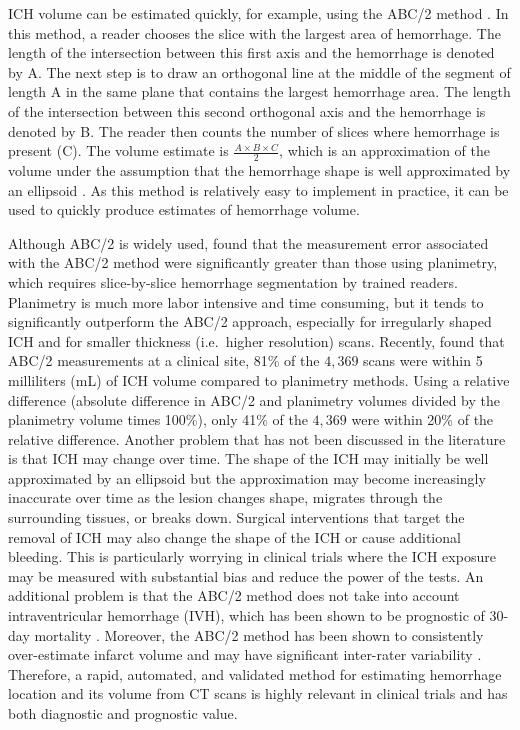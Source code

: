 \documentclass{elsarticle_nonatbib}\usepackage[]{graphicx}\usepackage[]{color}
\begin{document}
ICH volume can be estimated quickly, for example,  using the ABC/2 method \citep{broderick_volume_1993}.  In this method, a reader chooses the slice with the largest area of hemorrhage.  The length of the intersection between this first axis and the hemorrhage is denoted by A. The next step is to draw an orthogonal line  at the middle of the segment of length A in the same plane that contains the largest hemorrhage area. The length of the intersection between this second orthogonal axis and the hemorrhage is denoted by B.  The reader then counts the number of slices where hemorrhage is present (C).  The volume estimate is $\frac{A\times B\times C}{2}$, which is an approximation of the volume under the assumption that the hemorrhage shape is well approximated by an ellipsoid \citep{kothari_abcs_1996}.  As this method is relatively easy to implement in practice, it can be used to quickly produce estimates of hemorrhage volume. 

Although ABC/2 is widely used, \citet{divani_abcs_2011} found that the measurement error associated with the ABC/2 method were significantly greater than those using planimetry, which requires slice-by-slice hemorrhage segmentation by trained readers. Planimetry is much more labor intensive and time consuming, but it tends to significantly outperform the ABC/2 approach, especially for irregularly shaped ICH and for smaller thickness (i.e.~higher resolution) scans.  Recently, \citet{webb_accuracy_2015} found that ABC/2 measurements at a clinical site, 81\% of the $4,369$ scans were within 5 milliliters (mL) of ICH volume compared to planimetry methods.  Using a relative difference (absolute difference in ABC/2 and planimetry volumes divided by the planimetry volume times 100\%), only 41\% of the $4,369$ were within 20\% of the relative difference.   Another problem that has not been discussed in the literature is that ICH may change over time. The shape of the ICH may initially be well approximated by an ellipsoid but the approximation may become increasingly inaccurate over time as the lesion changes shape, migrates through the surrounding tissues, or breaks down.  Surgical interventions that target the removal of ICH may also change the shape of the ICH or cause additional bleeding. This is particularly worrying in clinical trials where the ICH exposure may be measured with substantial bias and reduce the power of the tests.  An additional problem is that the ABC/2 method does not take into account intraventricular hemorrhage (IVH), which has been shown to be prognostic of 30-day mortality \citep{hemphill_ich_2001, tuhrim_volume_1999}.  Moreover, the ABC/2 method has been shown to consistently over-estimate infarct volume \citep{pedraza_reliability_2012} and may have significant inter-rater variability \citep{hussein_reliability_2013}. Therefore, a rapid, automated, and validated method for estimating hemorrhage location and its volume from CT scans is highly relevant in clinical trials and has both diagnostic and prognostic value.
\end{document}
